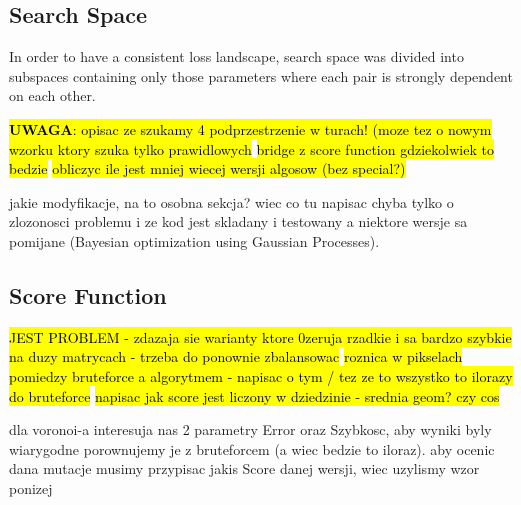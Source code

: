 \documentclass[format=acmsmall,screen,review,authordraft,nonacm]{acmart}
\begin{document}

\subsection{Search Space} %



In order to have a consistent loss landscape, search space was divided
into subspaces containing only those parameters where each pair is strongly
dependent on each other.

\hl{\textbf{UWAGA}: opisac ze szukamy 4 podprzestrzenie w turach! (moze tez o
nowym wzorku ktory szuka tylko prawidlowych}
\hl{bridge z score function gdziekolwiek to bedzie}
\hl{obliczyc ile jest mniej wiecej wersji algosow (bez special?)}

jakie modyfikacje, na to osobna sekcja? wiec co tu napisac
chyba tylko o zlozonosci problemu i ze kod jest skladany i testowany a niektore
wersje sa pomijane (Bayesian optimization using Gaussian Processes).

\subsection{Score Function} %

\hl{JEST PROBLEM - zdazaja sie warianty ktore 0zeruja rzadkie i sa bardzo
szybkie na duzy matrycach - trzeba do ponownie zbalansowac}
\hl{roznica w pikselach pomiedzy bruteforce a algorytmem - napisac o tym / tez
ze to wszystko to ilorazy do bruteforce}
\hl{napisac jak score jest liczony w dziedzinie - srednia geom? czy cos}


dla voronoi-a interesuja nas 2 parametry Error oraz Szybkosc, aby wyniki byly
wiarygodne porownujemy je z bruteforcem (a wiec bedzie to iloraz).
aby ocenic dana mutacje musimy przypisac jakis Score danej wersji, wiec uzylismy
wzor ponizej
\end{document}
